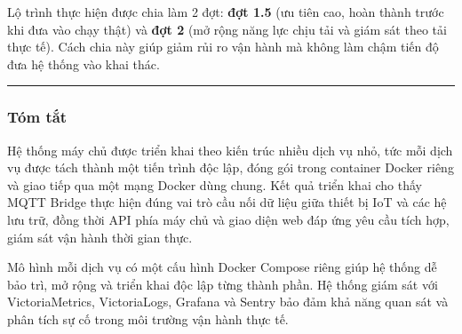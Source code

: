 \documentclass[a4paper]{extarticle}
\begin{document}
Lộ trình thực hiện được chia làm 2 đợt: \textbf{đợt 1.5} (ưu tiên cao,
hoàn thành trước khi đưa vào chạy thật) và \textbf{đợt 2} (mở rộng năng lực
chịu tải và giám sát theo tải thực tế). Cách chia này giúp giảm rủi ro
vận hành mà không làm chậm tiến độ đưa hệ thống vào khai thác.

\begin{center}\rule{0.5\linewidth}{0.5pt}\end{center}

\subsubsection{Tóm tắt}\label{tuxf3m-tux1eaft}

Hệ thống máy chủ được triển khai theo kiến trúc nhiều dịch vụ nhỏ, tức mỗi
dịch vụ được tách thành một tiến trình độc lập, đóng gói trong container
Docker riêng và giao tiếp
qua một mạng Docker dùng chung. Kết quả triển khai cho thấy
MQTT Bridge thực hiện đúng vai trò cầu nối dữ liệu giữa thiết bị IoT và
các hệ lưu trữ, đồng thời API phía máy chủ và giao diện web đáp ứng yêu
cầu tích hợp, giám sát vận hành thời gian thực.

Mô hình mỗi dịch vụ có một cấu hình Docker Compose riêng giúp hệ thống dễ bảo
trì, mở rộng và triển khai độc lập từng thành phần. Hệ thống giám sát
với VictoriaMetrics, VictoriaLogs, Grafana và Sentry bảo đảm khả năng
quan sát và phân tích sự cố trong môi trường vận hành thực tế.
\end{document}
